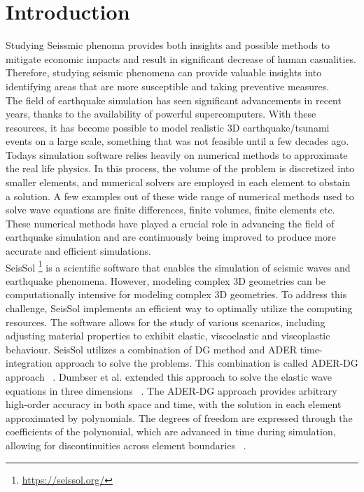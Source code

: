 
\chapter{Introduction}\label{chapter:introduction}

Studying Seissmic phenoma provides both insights and possible methods to mitigate economic impacts and result in significant decrease of human casualities.
Therefore, studying seismic phenomena can provide valuable insights into identifying areas that are more susceptible and taking preventive measures. \\

The field of earthquake simulation has seen significant advancements in recent years, thanks to the availability of powerful supercomputers.
With these resources, it has become possible to model realistic 3D earthquake/tsunami events on a large scale, something that was not feasible until a few decades ago. 
Todays simulation software relies heavily on numerical methods to approximate the real life physics. In this process, the volume of the problem is discretized into smaller elements, and numerical solvers are employed in each element to obstain a solution.
A few examples out of these wide range of numerical methods used to solve wave equations are finite differences, finite volumes, finite elements etc. These numerical methods have played a crucial role in advancing the field of earthquake simulation and are continuously being improved to produce more accurate and efficient simulations. \\

SeisSol \footnote{\url{https://seissol.org/}} is a scientific software that enables the simulation of seismic waves and earthquake phenomena. However, modeling complex 3D geometries can be computationally intensive for modeling complex 3D geometries.
To address this challenge, SeisSol implements an efficient way to optimally utilize the computing resources. The software allows for the study of various scenarios, including adjusting material properties to exhibit elastic, viscoelastic and viscoplastic behaviour.
SeisSol utilizes a combination of \ac{DG} method and \ac{ADER} time-integration approach to solve the problems.
This combination is called \ac{ADER}-\ac{DG} approach ~\parencite{dumbser}. Dumbser et al. extended this approach to solve the elastic wave equations in three dimensions ~\parencite{dumbser1}. The \ac{ADER}-\ac{DG} approach provides arbitrary high-order accuracy in both space and time, with the solution in each element approximated by polynomials.
The degrees of freedom are expressed through the coefficients of the polynomial, which are advanced in time during simulation, allowing for discontinuities across element boundaries ~\parencite{martin}. \\

